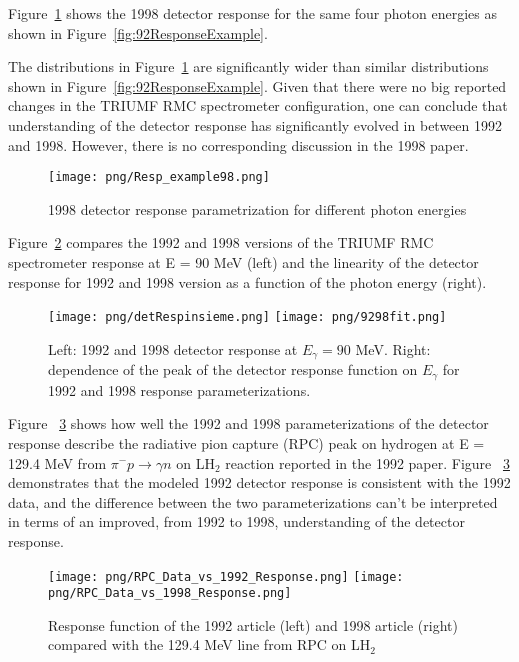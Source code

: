 Figure~\ref{fig:response98} shows the 1998 detector response for the same four photon energies as shown in Figure~\ref{fig:92ResponseExample}.

The distributions in Figure~\ref{fig:response98} are significantly wider than similar distributions
shown in Figure~\ref{fig:92ResponseExample}. Given that there were no big reported changes in the TRIUMF
RMC spectrometer configuration, one can conclude that understanding of the detector response has
significantly evolved in between 1992 and 1998. However, there is no corresponding discussion 
in the 1998 paper. 

\begin{figure}[!h]
\centering
\texttt{[image: png/Resp\_example98.png]}
\caption{1998 detector response parametrization for different photon energies}
\label{fig:response98}
\end{figure}

Figure~\ref{fig:shapecomp} compares the 1992 and 1998 versions of the
TRIUMF RMC spectrometer response at E = 90 MeV (left) and 
the linearity of the detector response for 1992 and 1998 version
as a function of the photon energy (right).

\begin{figure} [!h]
\centering
\texttt{[image: png/detRespinsieme.png]}
\texttt{[image: png/9298fit.png]}
\caption{
  Left: 1992 and 1998 detector response at $E_{\gamma}=90$ MeV.
  Right: dependence of the peak of the detector response function on $E_{\gamma}$
  for 1992 and 1998 response parameterizations.
}
\label{fig:shapecomp} 
\end{figure}

Figure ~\ref{p004} shows how well the 1992 and 1998 parameterizations of the detector
response describe the radiative pion capture (RPC) peak on hydrogen at E = 129.4 MeV
from $\pi^{-}p \rightarrow \gamma n$ on LH$_{2}$ reaction reported in the 1992 paper.
Figure ~\ref{p004} demonstrates that the modeled 1992 detector response is consistent
with the 1992 data, and the difference between the two parameterizations can't be
interpreted in terms of an improved, from 1992 to 1998, understanding of the detector
response.\\

  \begin{figure}[!h]
 \begin{center}
 \texttt{[image: png/RPC\_Data\_vs\_1992\_Response.png]} 
 \texttt{[image: png/RPC\_Data\_vs\_1998\_Response.png]} 
 \end{center}
 \caption{Response function of the 1992 article (left) and 1998 article (right) compared with the 129.4 MeV line from RPC on LH$_{2}$}
 \label{p004}
 \end{figure}

